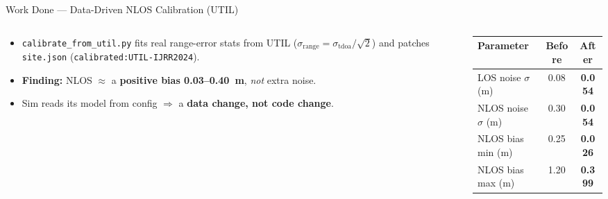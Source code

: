 \documentclass[aspectratio=169,10pt]{beamer}
\begin{document}
\begin{frame}{Work Done --- Data-Driven NLOS Calibration (UTIL)}
  \begin{columns}[T]
    \begin{column}{0.5\textwidth}
      \begin{itemize}\small
        \item \texttt{calibrate\_from\_util.py} fits real range-error stats from UTIL
              ($\sigma_{\text{range}}=\sigma_{\text{tdoa}}/\sqrt{2}$) and patches \texttt{site.json}
              (\texttt{calibrated:UTIL-IJRR2024}).
        \item \textbf{Finding:} NLOS $\approx$ a \textbf{positive bias 0.03--0.40~m}, \emph{not} extra noise.
        \item Sim reads its model from config $\Rightarrow$ a \textbf{data change, not code change}.
      \end{itemize}
    \end{column}
    \begin{column}{0.5\textwidth}
      \small
      \begin{tabular}{lcc}
        \toprule
        Parameter & Before & After \\
        \midrule
        LOS noise $\sigma$ (m)   & 0.08 & \textbf{0.054} \\
        NLOS noise $\sigma$ (m)  & 0.30 & \textbf{0.054} \\
        NLOS bias min (m)        & 0.25 & \textbf{0.026} \\
        NLOS bias max (m)        & 1.20 & \textbf{0.399} \\
        \bottomrule
      \end{tabular}
    \end{column}
  \end{columns}
\end{frame}
\end{document}

